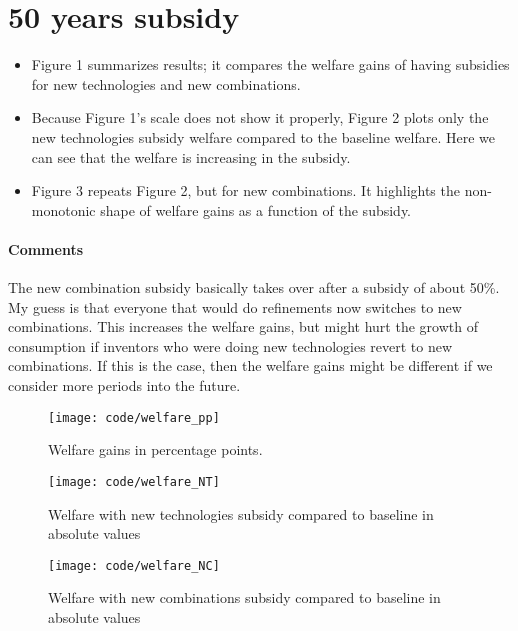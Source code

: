 \documentclass[a4paper,11pt]{article}
\begin{document}
\section*{50 years subsidy}

\begin{itemize}
\item Figure 1 summarizes results; it compares the welfare gains of having subsidies for new technologies and new combinations.
\item Because Figure 1's scale does not show it properly, Figure 2 plots only the new technologies subsidy welfare compared to the baseline welfare. Here we can see that the welfare is increasing in the subsidy.
\item Figure 3 repeats Figure 2, but for new combinations. It highlights the non-monotonic shape of welfare gains as a function of the subsidy.
\end{itemize}

\paragraph{Comments}
The new combination subsidy basically takes over after a subsidy of about 50\%. My guess is that everyone that would do refinements now switches to new combinations. This increases the welfare gains, but might hurt the growth of consumption if inventors who were doing new technologies revert to new combinations. If this is the case, then the welfare gains might be different if we consider more periods into the future.

\begin{figure}[h!]
\centering
\texttt{[image: code/welfare\_pp]}
\caption{Welfare gains in percentage points.}
\end{figure}

\begin{figure}[h!]
\centering
\texttt{[image: code/welfare\_NT]}
\caption{Welfare with new technologies subsidy compared to baseline in absolute values}
\end{figure}

\begin{figure}[h!]
\centering
\texttt{[image: code/welfare\_NC]}
\caption{Welfare with new combinations subsidy compared to baseline in absolute values}
\end{figure}
\end{document}
